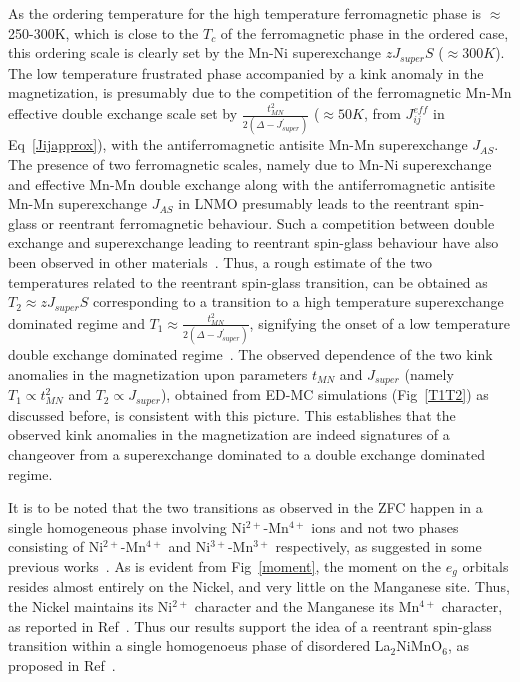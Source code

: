 \documentclass[english,aps,prb,twocolumn,showpacs]{revtex4-1}
\begin{document}
As the ordering temperature for the high temperature ferromagnetic phase is $\approx$ 250-300K, which is close to the
 $T_{c}$ of the ferromagnetic phase in the ordered case, this ordering scale is clearly set by the Mn-Ni superexchange
 $zJ_{super}S$ ($\approx 300K$). 
The low temperature frustrated phase accompanied by a kink anomaly in the magnetization, is
 presumably due to the competition of the ferromagnetic Mn-Mn effective double exchange scale set by $\frac{t_{MN}^{2}}{2(\Delta-J_{super}^{\prime})}$ ($\approx 50K$, from $J^{eff}_{ij}$ in Eq~\ref{Jijapprox}),
  with the antiferromagnetic antisite Mn-Mn superexchange $J_{AS}$. 
 The presence of two ferromagnetic scales, namely due to Mn-Ni superexchange and effective Mn-Mn double exchange
 along with the antiferromagnetic antisite Mn-Mn superexchange $J_{AS}$ in LNMO presumably leads to the
 reentrant spin-glass or reentrant ferromagnetic behaviour. Such a competition between double exchange and superexchange
 leading to reentrant spin-glass behaviour have also been observed in other materials~\cite{Mathieu}. Thus,
 a rough estimate of the two temperatures related to the reentrant spin-glass transition, can be obtained as
 $T_{2}\approx zJ_{super}S$ corresponding to a transition to a high temperature superexchange dominated regime and 
 $T_{1}\approx \frac{t_{MN}^{2}}{2(\Delta-J_{super}^{\prime})}$, signifying the onset of a low temperature double
 exchange dominated regime~\cite{TSG2}.  The observed
 dependence of the two kink anomalies in the magnetization upon parameters $t_{MN}$ and $J_{super}$ 
(namely $T_{1}\propto t_{MN}^{2}$ and $T_{2}\propto J_{super}$), obtained
 from ED-MC simulations (Fig~\ref{T1T2}) as discussed before, is consistent with this picture. This establishes that
 the observed kink anomalies in the magnetization are indeed signatures of a changeover from a superexchange
 dominated to a double exchange dominated regime. 


  It is to be noted that the two transitions as observed in  
 the ZFC happen in a single homogeneous phase involving Ni$^{2+}$-Mn$^{4+}$ ions and not two phases consisting of 
  Ni$^{2+}$-Mn$^{4+}$ and Ni$^{3+}$-Mn$^{3+}$ respectively, as suggested in some previous works~\cite{GoodenoughPRB}.
As is evident from Fig~\ref{moment}, the moment
 on the $e_{g}$ orbitals resides almost entirely on the Nickel, and very little on the Manganese site. 
 Thus, the 
 Nickel maintains its Ni$^{2+}$ character and the Manganese its Mn$^{4+}$ character, as reported in Ref~\cite{debraj}.
  Thus our results support the idea of a reentrant spin-glass transition within a single homogenoeus phase of
 disordered La$_{2}$NiMnO$_{6}$, as proposed in Ref~\cite{debraj}.  
\end{document}
